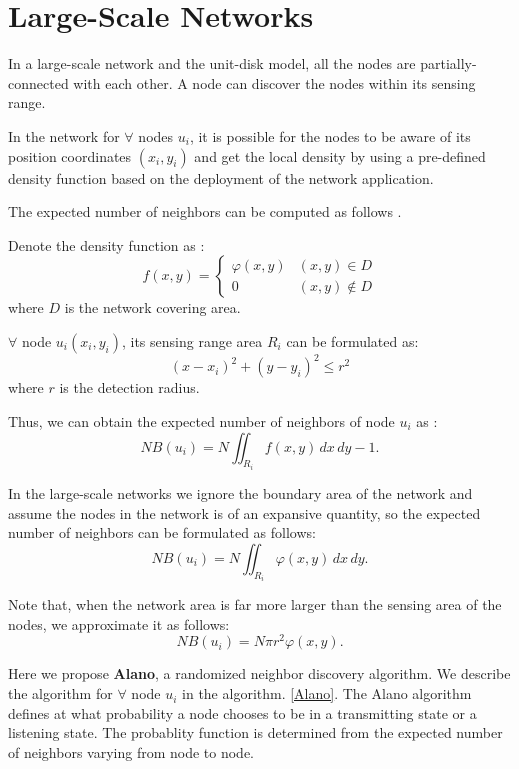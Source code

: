 \section{Large-Scale Networks}
\label{PCN}


In a large-scale network and the unit-disk model, 
all the nodes are partially-connected with each other.
A node can discover the nodes within its sensing 
range.

In the network for $\forall$ nodes $u_i$, 
it is possible for the nodes to be aware of its position coordinates $(x_i,y_i)$ 
and get the local density by using a pre-defined density function based on 
the deployment of the network application.

The expected number of neighbors can be computed as 
follows \cite{meester1996continuum, wang2015connectivity}.

Denote the density function as :
$$f(x,y)=
\begin{cases}
\varphi(x,y)& (x,y)\in D\\
0& (x,y)\notin D
\end{cases}$$
where $D$ is the network covering area.

$\forall$ node $u_i (x_i,y_i)$, its sensing range area $R_i$ can be formulated as:
$$
(x-x_i)^2+(y-y_i)^2 \leq r^2
$$
where $r$ is the detection radius.

Thus, we can obtain the expected number of neighbors of node $u_i$ as :
$$
NB(u_i) = N\iint_{R_i} f(x,y)\,dx\,dy - 1.
$$

In the large-scale networks we ignore the boundary area of the network and assume the
nodes in the network is of an expansive quantity, so the 
expected number of neighbors can be formulated as follows:
$$
NB(u_i) = N\iint_{R_i} \varphi(x,y)\,dx\,dy.
$$

Note that, when the network area is far more larger than the
sensing area of the nodes, we approximate it as follows:
$$
NB(u_i) = N\pi r^2 \varphi(x,y).
$$




Here we propose \textbf{Alano}, a randomized neighbor discovery algorithm. 
We describe the algorithm for $\forall$ node $u_i$ in the algorithm. \ref{Alano}.
The Alano algorithm defines at what probability a node chooses to be in a  
transmitting state or a listening state. The probablity function is determined
from the expected number of neighbors varying from node to node.


